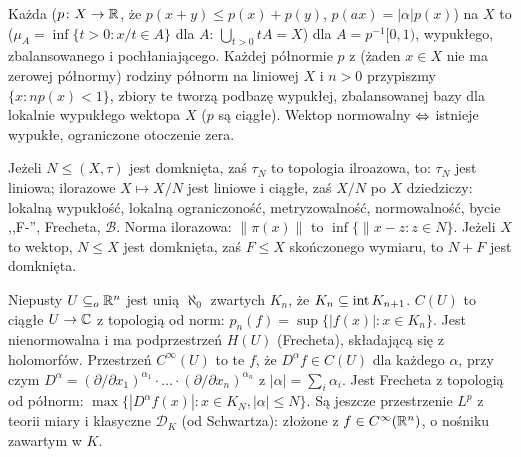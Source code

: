 Każda   ($p \colon X \to \mathbb{R}$, że $p(x+y) \le p(x) + p(y)$, $p(ax) = |\alpha| p(x)$) na $X$ to  ($\mu_A = \inf\{t > 0 : x/t \in A\}$ dla  $A$: $\bigcup_{t > 0} tA = X$) dla $A = p^{-1} [0, 1)$, wypukłego, zbalansowanego i pochłaniającego. 
Każdej półnormie $p$ z  (żaden $x \in X$ nie ma zerowej półnormy) rodziny półnorm na liniowej $X$ i $n > 0$ przypiszmy $\{x: np(x) < 1\}$, zbiory te tworzą podbazę wypukłej, zbalansowanej bazy dla lokalnie wypukłego wektopa $X$ ($p$ są ciągłe).
Wektop normowalny $\Leftrightarrow$ istnieje wypukłe, ograniczone otoczenie zera.

Jeżeli  $N \le (X, \tau)$ jest domknięta, zaś $\tau_N$ to topologia ilroazowa, to: $\tau_N$ jest liniowa; ilorazowe $X \mapsto X/N$ jest liniowe i ciągłe, zaś $X/N$ po $X$ dziedziczy: lokalną wypukłość, lokalną ograniczoność, metryzowalność, normowalność, bycie ,,F-'', Frecheta, $\mathscr B$.
Norma ilorazowa: $\|\pi(x)\|$ to $\inf \{\|x-z : z \in N\}$.
Jeżeli $X$ to wektop, $N \le X$ jest domknięta, zaś $F \le X$ skończonego wymiaru, to $N + F$ jest domknięta.

Niepusty  $U \subseteq_o \mathbb{R}^n$ jest unią $\aleph_0$ zwartych $K_n$, że $K_n \subseteq \operatorname{int} K_{n+1}$.
$C(U)$ to ciągłe $U \to \mathbb{C}$ z topologią od norm: $p_n(f) = \sup \{|f(x)| : x \in K_n\}$.
Jest nienormowalna i ma podprzestrzeń $H(U)$ (Frecheta), składającą się z holomorfów.
Przestrzeń $C^\infty(U)$ to te $f$, że $D^\alpha f \in C(U)$ dla każdego $\alpha$, przy czym $D^\alpha = (\partial/\partial x_1)^{\alpha_1} \cdot \ldots \cdot (\partial / \partial x_n)^{\alpha_n}$ z $|\alpha| = \sum_i \alpha_i$.
Jest Frecheta z topologią od półnorm: $\max \{|D^\alpha f(x)| : x \in K_N, |\alpha| \le N\}$.
Są jeszcze przestrzenie $L^p$ z teorii miary i klasyczne $\mathcal D_K$ (od Schwartza): złożone z $f \in C^\infty (\mathbb{R}^n)$, o nośniku zawartym w $K$.